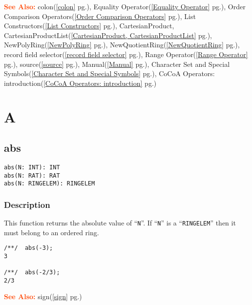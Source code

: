 \documentclass[a4paper]{mybook}
\newenvironment{command}{}{} %
\newcommand\SeeAlso{\par\textcolor{OrangeRed}{\textbf{\large See Also: }}}
\begin{document}
\begin{command}
\SeeAlso %
  colon(\ref{colon} pg.\pageref{colon}), 
    Equality Operator(\ref{Equality Operator} pg.\pageref{Equality Operator}), 
    Order Comparison Operators(\ref{Order Comparison Operators} pg.\pageref{Order Comparison Operators}), 
    List Constructors(\ref{List Constructors} pg.\pageref{List Constructors}), 
    CartesianProduct, CartesianProductList(\ref{CartesianProduct, CartesianProductList} pg.\pageref{CartesianProduct, CartesianProductList}), 
    NewPolyRing(\ref{NewPolyRing} pg.\pageref{NewPolyRing}), 
    NewQuotientRing(\ref{NewQuotientRing} pg.\pageref{NewQuotientRing}), 
    record field selector(\ref{record field selector} pg.\pageref{record field selector}), 
    Range Operator(\ref{Range Operator} pg.\pageref{Range Operator}), 
    source(\ref{source} pg.\pageref{source}), 
    Manual(\ref{Manual} pg.\pageref{Manual}), 
    Character Set and Special Symbols(\ref{Character Set and Special Symbols} pg.\pageref{Character Set and Special Symbols}), 
    CoCoA Operators: introduction(\ref{CoCoA Operators: introduction} pg.\pageref{CoCoA Operators: introduction})
\end{command} %

\chapter{A}  %
\label{A}

\section{abs}
\label{abs}
\begin{command} %


\begin{Verbatim}[label=syntax, rulecolor=\color{MidnightBlue},
frame=single]
abs(N: INT): INT
abs(N: RAT): RAT
abs(N: RINGELEM): RINGELEM
\end{Verbatim}


\subsection*{Description}

This function returns the absolute value of ``\verb&N&''.  If ``\verb&N&'' is a
``\verb&RINGELEM&'' then it must belong to an ordered ring.
\begin{Verbatim}[label=example, rulecolor=\color{PineGreen}, frame=single]
/**/  abs(-3);
3

/**/  abs(-2/3);
2/3
\end{Verbatim}


\SeeAlso %
  sign(\ref{sign} pg.\pageref{sign})
\end{command} %
\end{document}
